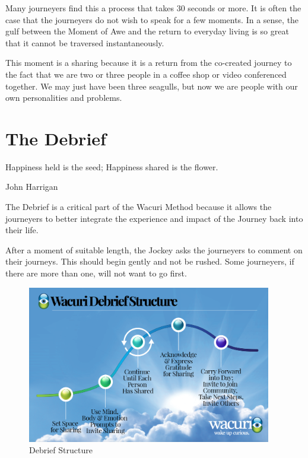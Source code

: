 \documentclass[12pt]{book}
\begin{document}
Many journeyers find this a process that takes 30 seconds or more. It
is often the case that the journeyers do not wish to speak for a few
moments. In a sense, the gulf between the Moment of Awe and the return
to everyday living is so great that it cannot be traversed
instantaneously.
					
This moment is a sharing because it is a return from the co-created
journey to the fact that we are two or three people in a coffee shop
or video conferenced together. We may just have been three seagulls,
but now we are people with our own personalities and problems.
				
			
		




\chapter{The Debrief}

\epigraph{Happiness held is the seed; Happiness shared is the flower.}{John Harrigan}

The Debrief is a critical part of the Wacuri Method because it allows
the journeyers to better integrate the experience and impact of the
Journey back into their life.
					
After a moment of suitable length, the Jockey asks the journeyers to
comment on their journeys. This should begin gently and not be
rushed. Some journeyers, if there are more than one, will not want to
go first.

\begin{figure}
  \centering
  \includegraphics[width=0.95\textwidth]{WacuriFigures/Wacuri-Debrief-Structure.png}
     \caption{Debrief Structure}
  \label{fig:debrief}     
\end{figure}
\end{document}
